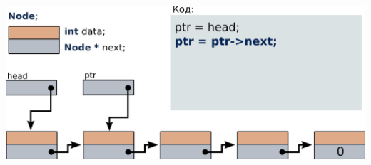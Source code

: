 \documentclass{article}
\begin{document}
\begin{center}
\includegraphics[scale=0.8]{../images/list_traversal_2.png}
\end{center}
\end{document}
